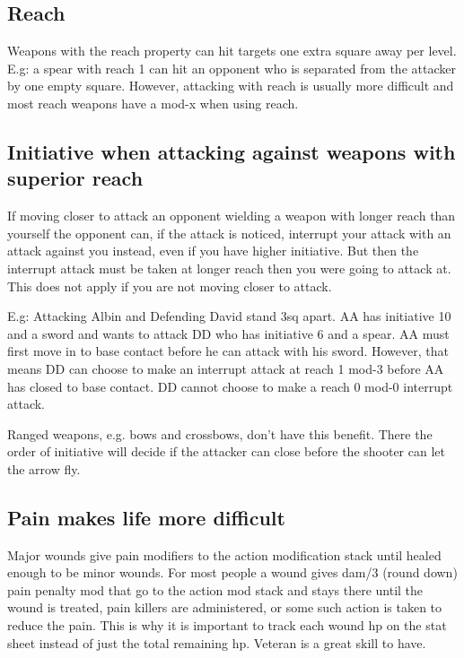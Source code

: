 \subsection*{Reach}
Weapons with the reach property can hit targets one extra square away per level.
E.g: a spear with reach 1 can hit an opponent who is separated from the attacker by one empty square. However, attacking with reach is usually more difficult and most reach weapons have a mod-x when using reach.


\subsection*{Initiative when attacking against weapons with superior reach}
If moving closer to attack an opponent wielding a weapon with longer reach than yourself the opponent can, if the attack is noticed, interrupt your attack with an attack against you instead, even if you have higher initiative. But then the interrupt attack must be taken at longer reach then you were going to attack at. This does not apply if you are not moving closer to attack.

E.g: Attacking Albin and Defending David stand 3sq apart. AA has initiative 10 and a sword and wants to attack DD who has initiative 6 and a spear. AA must first move in to base contact before he can attack with his sword. However, that means DD can choose to make an interrupt attack at reach 1 mod-3 before AA has closed to base contact. DD cannot choose to make a reach 0 mod-0 interrupt attack.

Ranged weapons, e.g. bows and crossbows, don't have this benefit. There the order of initiative will decide if the attacker can close before the shooter can let the arrow fly.


\subsection*{Pain makes life more difficult}
Major wounds give pain modifiers to the action modification stack until healed enough to be minor wounds.
For most people a wound gives dam/3 (round down) pain penalty mod that go to the action mod stack and stays there until the wound is treated, pain killers are administered, or some such action is taken to reduce the pain. This is why it is important to track each wound hp on the stat sheet instead of just the total remaining hp.
Veteran is a great skill to have.

